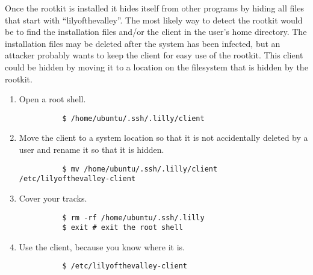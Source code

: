 Once the rootkit is installed it hides itself from other programs by hiding all files that start with \enquote{lilyofthevalley}.
The most likely way to detect the rootkit would be to find the installation files and/or the client in the user's home directory.
The installation files may be deleted after the system has been infected, but an attacker probably wants to keep the client for easy use of the rootkit.
This client could be hidden by moving it to a location on the filesystem that is hidden by the rootkit.

\begin{enumerate}
  \item Open a root shell.

        \begin{verbatim}
          $ /home/ubuntu/.ssh/.lilly/client
        \end{verbatim}

  \item Move the client to a system location so that it is not accidentally deleted by a user and rename it so that it is hidden.

        \begin{verbatim}
          $ mv /home/ubuntu/.ssh/.lilly/client /etc/lilyofthevalley-client
        \end{verbatim}

  \item Cover your tracks.

        \begin{verbatim}
          $ rm -rf /home/ubuntu/.ssh/.lilly
          $ exit # exit the root shell
        \end{verbatim}

  \item Use the client, because you know where it is.

        \begin{verbatim}
          $ /etc/lilyofthevalley-client
        \end{verbatim}

\end{enumerate}